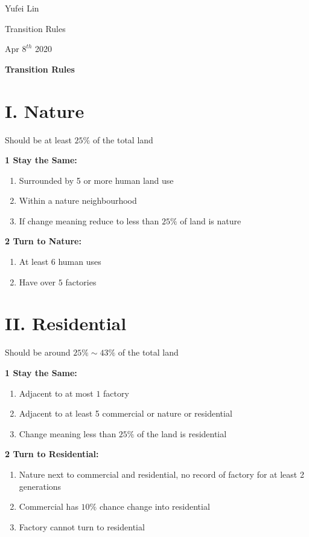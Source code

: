 \documentclass[a4paper,12pt]{report}
\begin{document}
\noindent
Yufei Lin

\noindent
Transition Rules

\noindent
Apr \(8^{th}\) 2020

\begin{center}
\textbf{Transition Rules}
\end{center}

\section*{I. Nature}Should be at least $25\%$ of the total land

\noindent
\textbf{1 Stay the Same: }

\begin{enumerate}
\item Surrounded by 5 or more human land use
\item Within a nature neighbourhood
\item If change meaning reduce to less than $25\%$ of land is nature
\end{enumerate}

\noindent
\textbf{2 Turn to Nature:}

\noindent
\begin{enumerate}
\item At least $6$ human uses 
\item Have over $5$ factories
\end{enumerate}

\section*{II. Residential}Should be around $25\%\sim 43\%$ of the total land

\noindent
\textbf{1 Stay the Same: }

\begin{enumerate}
\item Adjacent to at most $1$ factory
\item Adjacent to at least 5 commercial or nature or residential
\item Change meaning less than $25\%$ of the land is residential
\end{enumerate}

\noindent
\textbf{2 Turn to Residential:}

\noindent
\begin{enumerate}
\item Nature next to commercial and residential, no record of factory for at least 2 generations
\item Commercial has $10\%$ chance change into residential
\item Factory cannot turn to residential
\end{enumerate}
\end{document}
